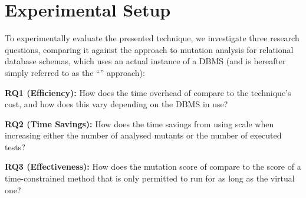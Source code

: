 
\vspace{-.5em}

\section{Experimental Setup}
\label{sec:experimental-setup}

% 

To experimentally evaluate the presented \vma technique, we investigate three research questions, comparing it against the \Original approach to mutation analysis for relational database schemas, which uses an actual instance of a DBMS (and is hereafter simply referred to as the ``\Original'' approach):

\vspace{5pt}

\noindent
\textbf{RQ1 (Efficiency):} How does the time overhead of \vma compare to the \Standard technique's cost, and how does
this vary depending on the DBMS in use?

\vspace{5pt}

\noindent
\textbf{RQ2 (Time Savings):} How does the time savings from using \vma scale when increasing either the number
of analysed mutants or the number of executed tests?

\vspace{5pt}

\noindent
\textbf{RQ3 (Effectiveness):} How does the mutation score of \vma compare to the score of a time-constrained method that
is only permitted to run for as long as the virtual one?


